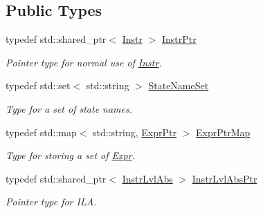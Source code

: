 \subsection*{Public Types}
\begin{DoxyCompactItemize}
\item 
\mbox{\label{classilang_1_1_instr_af43ebb1fe223b369e42b5600f902b4b4}} 
typedef std\+::shared\+\_\+ptr$<$ \mbox{\hyperlink{classilang_1_1_instr}{Instr}} $>$ \mbox{\hyperlink{classilang_1_1_instr_af43ebb1fe223b369e42b5600f902b4b4}{Instr\+Ptr}}
\begin{DoxyCompactList}\small\item\em Pointer type for normal use of \mbox{\hyperlink{classilang_1_1_instr}{Instr}}. \end{DoxyCompactList}\item 
\mbox{\label{classilang_1_1_instr_aa9f7f07cfbd07809131085e6190f489a}} 
typedef std\+::set$<$ std\+::string $>$ \mbox{\hyperlink{classilang_1_1_instr_aa9f7f07cfbd07809131085e6190f489a}{State\+Name\+Set}}
\begin{DoxyCompactList}\small\item\em Type for a set of state names. \end{DoxyCompactList}\item 
\mbox{\label{classilang_1_1_instr_a0a1eea1e8e5086d0ef93bfc50013107a}} 
typedef std\+::map$<$ std\+::string, \mbox{\hyperlink{namespaceilang_a7c4196c72e53ea4df4b7861af7bc3bce}{Expr\+Ptr}} $>$ \mbox{\hyperlink{classilang_1_1_instr_a0a1eea1e8e5086d0ef93bfc50013107a}{Expr\+Ptr\+Map}}
\begin{DoxyCompactList}\small\item\em Type for storing a set of \mbox{\hyperlink{classilang_1_1_expr}{Expr}}. \end{DoxyCompactList}\item 
\mbox{\label{classilang_1_1_instr_ab36b0ed04e0c44e66867ed1d61009f12}} 
typedef std\+::shared\+\_\+ptr$<$ \mbox{\hyperlink{classilang_1_1_instr_lvl_abs}{Instr\+Lvl\+Abs}} $>$ \mbox{\hyperlink{classilang_1_1_instr_ab36b0ed04e0c44e66867ed1d61009f12}{Instr\+Lvl\+Abs\+Ptr}}
\begin{DoxyCompactList}\small\item\em Pointer type for I\+LA. \end{DoxyCompactList}\end{DoxyCompactItemize}
